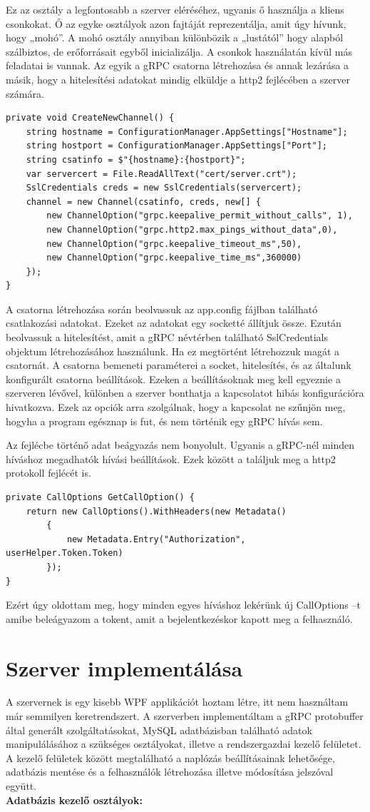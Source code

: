 \documentclass[
]{thesis-ekf}
\theoremstyle{definition}
\theoremstyle{remark}
\begin{document}
Ez az osztály a legfontosabb a szerver eléréséhez, ugyanis ő használja a kliens csonkokat. Ő az egyke osztályok azon fajtáját reprezentálja, amit úgy hívunk, hogy „mohó”. A mohó osztály annyiban különbözik a „lustától” hogy alapból szálbiztos, de erőforrásait egyből inicializálja. A csonkok használatán kívül más feladatai is vannak. Az egyik a gRPC csatorna létrehozása és annak lezárása a másik, hogy a hitelesítési adatokat mindig elküldje a http2 fejlécében a szerver számára.
\begin{lstlisting}
private void CreateNewChannel() {
	string hostname = ConfigurationManager.AppSettings["Hostname"];
	string hostport = ConfigurationManager.AppSettings["Port"];
	string csatinfo = $"{hostname}:{hostport}";
	var servercert = File.ReadAllText("cert/server.crt");
	SslCredentials creds = new SslCredentials(servercert);
	channel = new Channel(csatinfo, creds, new[] {
		new ChannelOption("grpc.keepalive_permit_without_calls", 1),
		new ChannelOption("grpc.http2.max_pings_without_data",0),
		new ChannelOption("grpc.keepalive_timeout_ms",50),
		new ChannelOption("grpc.keepalive_time_ms",360000)
	});
}
\end{lstlisting}
A csatorna létrehozása során beolvassuk az app.config fájlban található csatlakozási adatokat. Ezeket az adatokat egy socketté állítjuk össze. Ezután beolvassuk a hitelesítést, amit a gRPC névtérben található SslCredentials objektum létrehozásához használunk. Ha ez megtörtént létrehozzuk magát a csatornát. A csatorna bemeneti paraméterei a socket, hitelesítés, és az általunk konfigurált csatorna beállítások. Ezeken a beállításoknak meg kell egyeznie a szerveren lévővel, különben a szerver bonthatja a kapcsolatot hibás konfigurációra hivatkozva. Ezek az opciók arra szolgálnak, hogy a kapcsolat ne szűnjön meg, hogyha a program egésznap is fut, és nem történik egy gRPC hívás sem.

Az fejlécbe történő adat beágyazás nem bonyolult. Ugyanis a gRPC-nél minden híváshoz megadhatók hívási beállítások. Ezek között a találjuk meg a http2 protokoll fejlécét is.
\begin{lstlisting}
private CallOptions GetCallOption() {
	return new CallOptions().WithHeaders(new Metadata()
		{
			new Metadata.Entry("Authorization", userHelper.Token.Token)
		});
}
\end{lstlisting}
Ezért úgy oldottam meg, hogy minden egyes híváshoz lekérünk új CallOptions –t amibe beleágyazom a tokent, amit a bejelentkezéskor kapott meg a felhasználó. 

\section {Szerver implementálása}
A szervernek is egy kisebb WPF applikációt hoztam létre, itt nem használtam már semmilyen keretrendszert. A szerverben implementáltam a gRPC protobuffer által generált szolgáltatásokat, MySQL adatbázisban található adatok manipulálásához a szükséges osztályokat, illetve a rendszergazdai kezelő felületet.  A kezelő felületek között megtalálható a naplózás beállításainak lehetősége, adatbázis mentése és a felhasználók létrehozása illetve módosítása jelszóval együtt.\\
\textbf{Adatbázis kezelő osztályok:}
\end{document}
